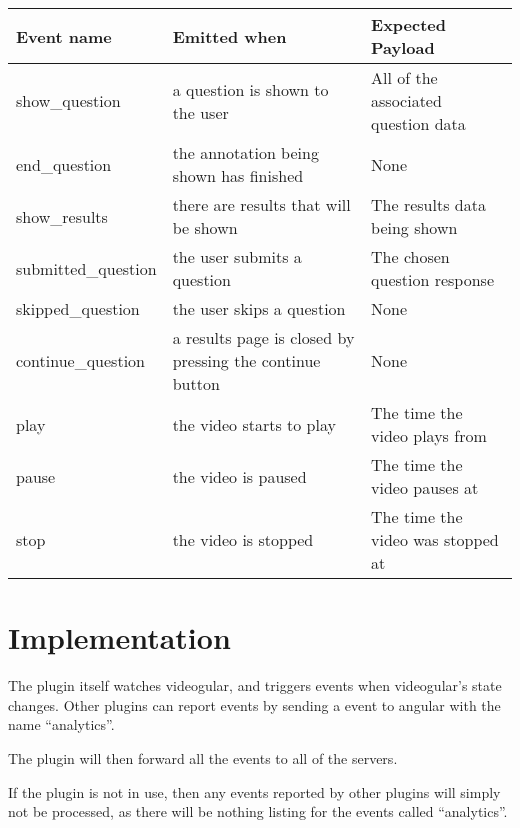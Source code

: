 \begin{tabular}{p{3.2cm} p{7cm} p{4cm}}

\textbf{Event name} & \textbf{Emitted when} & \textbf{Expected Payload} \\
\hline
show\_question & a question is shown to the user & All of the associated question data \\
\hline
end\_question & the annotation being shown has finished & None \\
\hline
show\_results & there are results that will be shown & The results data being shown \\
\hline
submitted\_question & the user submits a question & The chosen question response \\
\hline
skipped\_question & the user skips a question & None \\
\hline
continue\_question & a results page is closed by pressing the continue button & None \\
\hline
play & the video starts to play & The time the video plays from \\
\hline
pause & the video is paused & The time the video pauses at \\
\hline
stop & the video is stopped & The time the video was stopped at \\
\end{tabular}

\section{Implementation}

The plugin itself watches videogular, and triggers events when videogular's state changes. Other plugins can report events by sending a event to angular with the name ``analytics''.

The plugin will then forward all the events to all of the servers.

If the plugin is not in use, then any events reported by other plugins will simply not be processed, as there will be nothing listing for the events called ``analytics''.

